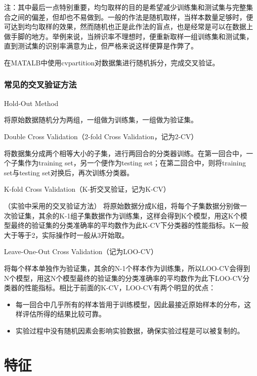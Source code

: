 \documentclass[12pt]{article}
\begin{document}
        {\color{blue}注：}其中最后一点特别重要，均匀取样的目的是希望减少训练集和测试集与完整集合之间的偏差，但却也不易做到。一般的作法是随机取样，当样本数量足够时，便可达到均匀取样的效果，然而随机也正是此作法的盲点，也是经常是可以在数据上做手脚的地方。举例来说，当辨识率不理想时，便重新取样一组训练集和测试集，直到测试集的识别率满意为止，但严格来说这样便算是作弊了。
        
        在MATALB中使用cvpartition对数据集进行随机拆分，完成交叉验证。
        
\subsubsection{常见的交叉验证方法}

\begin{itemize}
    \item Hold-Out Method
    
    将原始数据随机分为两组，一组做为训练集，一组做为验证集。
    \item Double Cross Validation（2-fold Cross Validation，记为2-CV）
    
    将数据集分成两个相等大小的子集，进行两回合的分类器训练。在第一回合中，一个子集作为training set，另一个便作为testing set；在第二回合中，则将training set与testing set对换后，再次训练分类器。
    {\color{blue}\item K-fold Cross Validation（K-折交叉验证，记为K-CV）}（实验中采用的交叉验证方法）
    \label{kCM}
    将原始数据分成K组，将每个子集数据分别做一次验证集，其余的K-1组子集数据作为训练集，这样会得到K个模型，用这K个模型最终的验证集的分类准确率的平均数作为此K-CV下分类器的性能指标。K一般大于等于2，实际操作时一般从3开始取。
    \item Leave-One-Out Cross Validation（记为LOO-CV）
    
    将每个样本单独作为验证集，其余的N-1个样本作为训练集，所以LOO-CV会得到N个模型，用这N个模型最终的验证集的分类准确率的平均数作为此下LOO-CV分类器的性能指标。相比于前面的K-CV，LOO-CV有两个明显的优点：
    \begin{itemize}
        \item 每一回合中几乎所有的样本皆用于训练模型，因此最接近原始样本的分布，这样评估所得的结果比较可靠。
        \item 实验过程中没有随机因素会影响实验数据，确保实验过程是可以被复制的。
    \end{itemize}
\end{itemize}


\section{特征}
\end{document}
